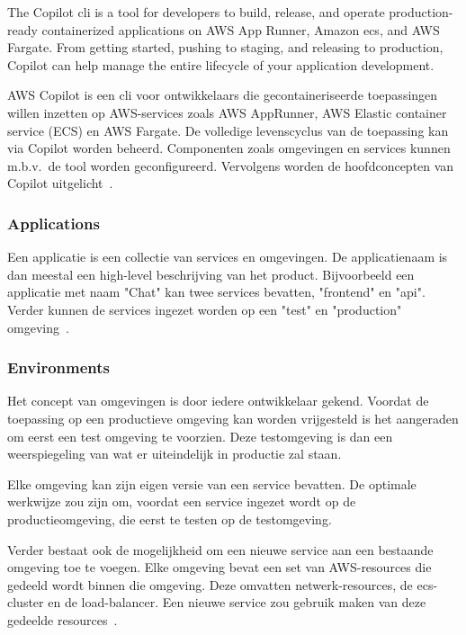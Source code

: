 The Copilot \acrshort{cli} is a tool for developers to build, release, and operate production-ready containerized applications on AWS App Runner,
Amazon \acrshort{ecs}, and AWS Fargate.
From getting started, pushing to staging, and releasing to production, Copilot can help manage the entire lifecycle of your application development.

AWS Copilot is een \acrfull{cli} voor ontwikkelaars die gecontaineriseerde toepassingen willen inzetten op AWS-services zoals AWS AppRunner, AWS Elastic container service (ECS) en AWS Fargate.
De volledige levenscyclus van de toepassing kan via Copilot worden beheerd.
Componenten zoals omgevingen en services kunnen m.b.v.\ de tool worden geconfigureerd.
Vervolgens worden de hoofdconcepten van Copilot uitgelicht~\autocite{Karakus2022}.

\subsubsection{Applications}

Een applicatie is een collectie van services en omgevingen.
De applicatienaam is dan meestal een high-level beschrijving van het product.
Bijvoorbeeld een applicatie met naam "Chat" kan twee services bevatten, "frontend" en "api".
Verder kunnen de services ingezet worden op een "test" en "production" omgeving~\autocite{Karakus2022}.

\subsubsection{Environments}

Het concept van omgevingen is door iedere ontwikkelaar gekend.
Voordat de toepassing op een productieve omgeving kan worden vrijgesteld is het aangeraden om eerst een test omgeving te voorzien.
Deze testomgeving is dan een weerspiegeling van wat er uiteindelijk in productie zal staan.

Elke omgeving kan zijn eigen versie van een service bevatten.
De optimale werkwijze zou zijn om, voordat een service ingezet wordt op de productieomgeving, die eerst te testen op de testomgeving.

Verder bestaat ook de mogelijkheid om een nieuwe service aan een bestaande omgeving toe te voegen.
Elke omgeving bevat een set van AWS-resources die gedeeld wordt binnen die omgeving.
Deze omvatten netwerk-resources, de \acrshort{ecs}-cluster en de load-balancer.
Een nieuwe service zou gebruik maken van deze gedeelde resources~\autocite{Karakus2022}.


